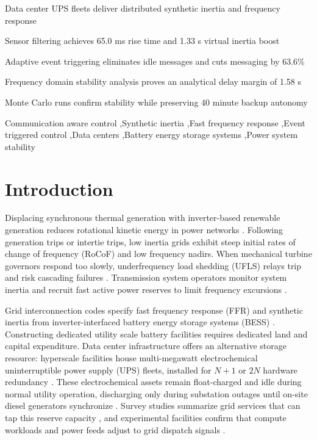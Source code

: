 \documentclass[preprint,12pt]{elsarticle}
\begin{document}
\begin{frontmatter}
\begin{highlights}
\item Data center UPS fleets deliver distributed synthetic inertia and frequency response
\item Sensor filtering achieves 65.0 ms rise time and 1.33 s virtual inertia boost
\item Adaptive event triggering eliminates idle messages and cuts messaging by 63.6\%
\item Frequency domain stability analysis proves an analytical delay margin of 1.58 s
\item Monte Carlo runs confirm stability while preserving 40 minute backup autonomy
\end{highlights}

\begin{keyword}
Communication aware control \sep Synthetic inertia \sep Fast frequency response \sep Event triggered control \sep Data centers \sep Battery energy storage systems \sep Power system stability
\end{keyword}

\end{frontmatter}

\linenumbers

\section{Introduction}
\label{sec:intro}

Displacing synchronous thermal generation with inverter-based renewable generation reduces rotational kinetic energy in power networks \cite{tielens2016,ulbig2014}. Following generation trips or intertie trips, low inertia grids exhibit steep initial rates of change of frequency (RoCoF) and low frequency nadirs. When mechanical turbine governors respond too slowly, underfrequency load shedding (UFLS) relays trip and risk cascading failures \cite{dulal2026inertia,beck2007}. Transmission system operators monitor system inertia and recruit fast active power reserves to limit frequency excursions \cite{dulal2026inertia,xu2014}.

Grid interconnection codes specify fast frequency response (FFR) and synthetic inertia from inverter-interfaced battery energy storage systems (BESS) \cite{he2026coordinated,abdollahi2026flexibility,erickson2020ffr}. Constructing dedicated utility scale battery facilities requires dedicated land and capital expenditure. Data center infrastructure offers an alternative storage resource: hyperscale facilities house multi-megawatt electrochemical uninterruptible power supply (UPS) fleets, installed for $N+1$ or $2N$ hardware redundancy \cite{wierman2014,mohammadi2026giups}. These electrochemical assets remain float-charged and idle during normal utility operation, discharging only during substation outages until on-site diesel generators synchronize \cite{yu2025reliability}. Survey studies summarize grid services that can tap this reserve capacity \cite{mohammadi2026giups}, and experimental facilities confirm that compute workloads and power feeds adjust to grid dispatch signals \cite{colangelo2026gridinteractive}.
\end{document}
